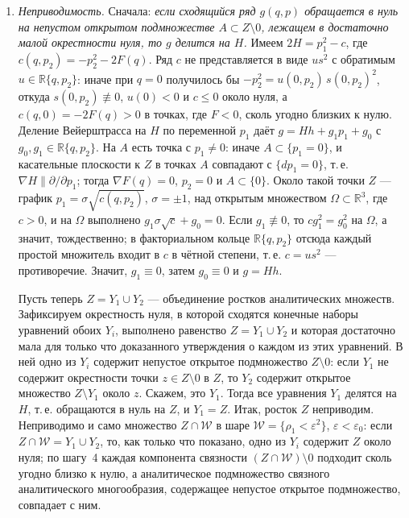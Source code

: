 \documentclass[11pt,a4paper]{article}
\theoremstyle{definition}
\newcommand{\R}{\mathbb R}
\newcommand{\eps}{\varepsilon}
\begin{document}
\begin{enumerate}[leftmargin=*,label=\arabic*.]
\item \emph{Неприводимость.} Сначала: \emph{если сходящийся ряд $g(q,p)$ обращается в нуль на непустом
открытом подмножестве $A\subset Z\setminus0$, лежащем в достаточно малой окрестности нуля, то $g$
делится на $H$.} Имеем $2H=p_1^2-c$, где $c(q,p_2)=-p_2^2-2F(q)$. Ряд $c$ не представляется в виде
$us^2$ с обратимым $u\in\R\{q,p_2\}$: иначе при $q=0$ получилось бы $-p_2^2=u(0,p_2)\,s(0,p_2)^2$,
откуда $s(0,p_2)\not\equiv0$, $u(0)<0$ и $c\le0$ около нуля, а $c(q,0)=-2F(q)>0$ в точках, где $F<0$, сколь угодно близких
к нулю. Деление Вейерштрасса на $H$ по переменной $p_1$ даёт $g=Hh+g_1p_1+g_0$ с
$g_0,g_1\in\R\{q,p_2\}$. На $A$ есть точка с $p_1\ne0$: иначе $A\subset\{p_1=0\}$, и касательные плоскости
к $Z$ в точках $A$ совпадают с $\{dp_1=0\}$, т.\,е. $\nabla H\parallel\partial/\partial p_1$; тогда $\nabla F(q)=0$,
$p_2=0$ и $A\subset\{0\}$. Около такой точки $Z$ --- график $p_1=\sigma\sqrt{c(q,p_2)}$, $\sigma=\pm1$, над
открытым множеством $\Omega\subset\R^3$, где $c>0$, и на $\Omega$ выполнено $g_1\sigma\sqrt c+g_0=0$. Если
$g_1\not\equiv0$, то $cg_1^2=g_0^2$ на $\Omega$, а значит, тождественно; в факториальном кольце
$\R\{q,p_2\}$ отсюда каждый простой множитель входит в $c$ в чётной степени, т.\,е. $c=us^2$ ---
противоречие. Значит, $g_1\equiv0$, затем $g_0\equiv0$ и $g=Hh$.

Пусть теперь $Z=Y_1\cup Y_2$ --- объединение ростков аналитических множеств. Зафиксируем
окрестность нуля, в которой сходятся конечные наборы уравнений обоих $Y_i$, выполнено равенство
$Z=Y_1\cup Y_2$ и которая достаточно мала для только что доказанного утверждения о каждом из этих
уравнений. В ней одно из $Y_i$ содержит непустое открытое подмножество $Z\setminus0$: если $Y_1$ не
содержит окрестности точки $z\in Z\setminus0$ в $Z$, то $Y_2$ содержит открытое множество
$Z\setminus Y_1$ около $z$. Скажем, это $Y_1$. Тогда все уравнения $Y_1$ делятся на $H$, т.\,е.
обращаются в нуль на $Z$, и $Y_1=Z$. Итак, росток $Z$ неприводим. Неприводимо и само множество
$Z\cap\mathcal W$ в шаре $\mathcal W=\{\rho_1<\eps^2\}$, $\eps<\eps_0$: если $Z\cap\mathcal W=Y_1\cup Y_2$, то, как только что показано,
одно из $Y_i$ содержит $Z$ около нуля; по шагу~4 каждая компонента связности $(Z\cap\mathcal W)\setminus0$
подходит сколь угодно близко к нулю, а аналитическое подмножество связного аналитического
многообразия, содержащее непустое открытое подмножество, совпадает с ним.


\end{enumerate}
\end{document}
